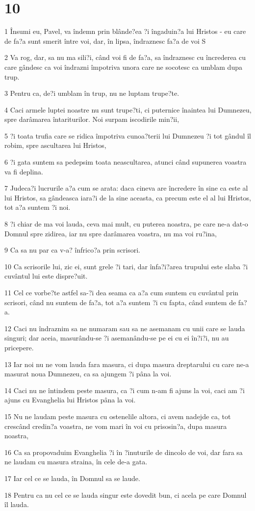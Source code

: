\chapter{10}

\par 1 Însumi eu, Pavel, va îndemn prin blânde?ea ?i îngaduin?a lui Hristos - eu care de fa?a sunt smerit între voi, dar, în lipsa, îndraznesc fa?a de voi S
\par 2 Va rog, dar, sa nu ma sili?i, când voi fi de fa?a, sa îndraznesc cu încrederea cu care gândesc ca voi îndrazni împotriva unora care ne socotesc ca umblam dupa trup.
\par 3 Pentru ca, de?i umblam în trup, nu ne luptam trupe?te.
\par 4 Caci armele luptei noastre nu sunt trupe?ti, ci puternice înaintea lui Dumnezeu, spre darâmarea întariturilor. Noi surpam iscodirile min?ii,
\par 5 ?i toata trufia care se ridica împotriva cunoa?terii lui Dumnezeu ?i tot gândul îl robim, spre ascultarea lui Hristos,
\par 6 ?i gata suntem sa pedepsim toata neascultarea, atunci când supunerea voastra va fi deplina.
\par 7 Judeca?i lucrurile a?a cum se arata: daca cineva are încredere în sine ca este al lui Hristos, sa gândeasca iara?i de la sine aceasta, ca precum este el al lui Hristos, tot a?a suntem ?i noi.
\par 8 ?i chiar de ma voi lauda, ceva mai mult, cu puterea noastra, pe care ne-a dat-o Domnul spre zidirea, iar nu spre darâmarea voastra, nu ma voi ru?ina,
\par 9 Ca sa nu par ca v-a? înfrico?a prin scrisori.
\par 10 Ca scrisorile lui, zic ei, sunt grele ?i tari, dar înfa?i?area trupului este slaba ?i cuvântul lui este dispre?uit.
\par 11 Cel ce vorbe?te astfel sa-?i dea seama ca a?a cum suntem cu cuvântul prin scrisori, când nu suntem de fa?a, tot a?a suntem ?i cu fapta, când suntem de fa?a.
\par 12 Caci nu îndraznim sa ne numaram sau sa ne asemanam cu unii care se lauda singuri; dar aceia, masurându-se ?i asemanându-se pe ei cu ei în?i?i, nu au pricepere.
\par 13 Iar noi nu ne vom lauda fara masura, ci dupa masura dreptarului cu care ne-a masurat noua Dumnezeu, ca sa ajungem ?i pâna la voi.
\par 14 Caci nu ne întindem peste masura, ca ?i cum n-am fi ajuns la voi, caci am ?i ajuns cu Evanghelia lui Hristos pâna la voi.
\par 15 Nu ne laudam peste masura cu ostenelile altora, ci avem nadejde ca, tot crescând credin?a voastra, ne vom mari în voi cu prisosin?a, dupa masura noastra,
\par 16 Ca sa propovaduim Evanghelia ?i în ?inuturile de dincolo de voi, dar fara sa ne laudam cu masura straina, în cele de-a gata.
\par 17 Iar cel ce se lauda, în Domnul sa se laude.
\par 18 Pentru ca nu cel ce se lauda singur este dovedit bun, ci acela pe care Domnul îl lauda.

